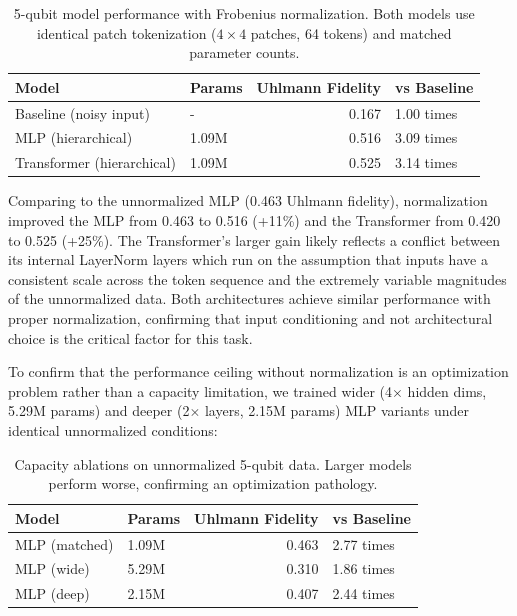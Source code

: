 \documentclass{ieeeqccl}
\begin{document}
\begin{table}[htbp]
\caption{\label{tab:org449a1d3}5-qubit model performance with Frobenius normalization.  Both models use identical patch tokenization (\(4\times 4\) patches, 64 tokens) and matched parameter counts.}
\centering
\begin{tabular}{llrl}
Model & Params & Uhlmann Fidelity & vs Baseline\\[0pt]
\hline
Baseline (noisy input) & - & 0.167 & 1.00 times\\[0pt]
MLP (hierarchical) & 1.09M & 0.516 & 3.09 times\\[0pt]
Transformer (hierarchical) & 1.09M & 0.525 & 3.14 times\\[0pt]
\end{tabular}
\end{table}

Comparing to the unnormalized MLP (0.463 Uhlmann fidelity), normalization improved the MLP from 0.463 to 0.516 (+11\%) and the Transformer from 0.420 to 0.525 (+25\%).  The Transformer's larger gain likely reflects a conflict between its internal LayerNorm layers which run on the assumption that inputs have a consistent scale across the token sequence and the extremely variable magnitudes of the unnormalized data.  Both architectures achieve similar performance with proper normalization, confirming that input conditioning and not architectural choice is the critical factor for this task.

To confirm that the performance ceiling without normalization is an optimization problem rather than a capacity limitation, we trained wider (4\(\times\) hidden dims, 5.29M params) and deeper (2\(\times\) layers, 2.15M params) MLP variants under identical unnormalized conditions:

\begin{table}[htbp]
\caption{\label{tab:orgb987053}Capacity ablations on unnormalized 5-qubit data.  Larger models perform worse, confirming an optimization pathology.}
\centering
\begin{tabular}{llrl}
Model & Params & Uhlmann Fidelity & vs Baseline\\[0pt]
\hline
MLP (matched) & 1.09M & 0.463 & 2.77 times\\[0pt]
MLP (wide) & 5.29M & 0.310 & 1.86 times\\[0pt]
MLP (deep) & 2.15M & 0.407 & 2.44 times\\[0pt]
\end{tabular}
\end{table}
\end{document}
